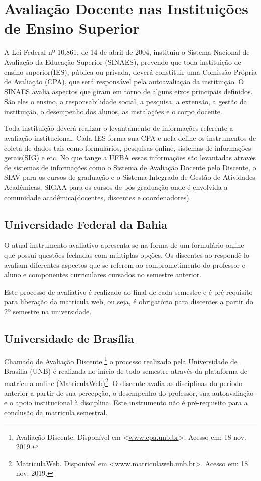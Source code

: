 \documentclass[12pt, a4paper]{report}
\begin{document}
\section{Avaliação Docente nas Instituições de Ensino Superior}

 A Lei Federal nº 10.861, de 14 de abril de 2004, instituiu o Sistema Nacional de Avaliação da Educação Superior (SINAES), prevendo que toda instituição de ensino superior(IES), pública ou privada, deverá constituir uma Comissão Própria de Avaliação (CPA), que será responsável pela autoavaliação da instituição. O SINAES avalia aspectos que giram em torno de alguns eixos principais definidos. São eles o ensino, a responsabilidade social, a pesquisa, a extensão, a gestão da instituição, o desempenho dos alunos, as instalações e o corpo docente.
 
 Toda instituição deverá realizar o levantamento de informações referente a avaliação institucional. Cada IES forma sua CPA e nela define os instrumentos de coleta de dados tais como formulários, pesquisas online, sistemas de informações gerais(SIG) e etc. No que tange a UFBA essas informações são levantadas através de sistemas de informações como o Sistema de Avaliação Docente pelo Discente, o SIAV para os cursos de graduação e o Sistema Integrado de Gestão de Atividades Acadêmicas, SIGAA para os cursos de pós graduação onde é envolvida a comunidade acadêmica(docentes, discentes e coordenadores).
 
 \subsection{Universidade Federal da Bahia}
 O atual instrumento avaliativo apresenta-se na forma de um formulário online que possui questões fechadas com múltiplas opções. Os discentes ao respondê-lo avaliam diferentes aspectos que se referem ao comprometimento do professor e aluno e componentes curriculares cursados no semestre anterior.
 
 Este processo de avaliativo é realizado ao final de cada semestre e é pré-requisito para liberação da matricula web, ou seja, é obrigatório para discentes a partir do 2º semestre na universidade.
 
\subsection{Universidade de Brasília}
 Chamado de Avaliação Discente \footnote{Avaliação Discente. Disponível em <\url{www.cpa.unb.br}>. Acesso em: 18 nov. 2019.} o processo realizado pela Universidade de Brasília (UNB) é realizada no início de todo semestre através da plataforma de matrícula online (MatriculaWeb)\footnote{MatriculaWeb. Disponível em <\url{www.matriculaweb.unb.br}>. Acesso em: 18 nov. 2019.}. O discente avalia as disciplinas do período anterior a partir de sua percepção, o desempenho do professor, sua autoavaliação e o apoio institucional à disciplina. Este instrumento não é pré-requisito para a conclusão da matricula semestral.
 
\end{document}
